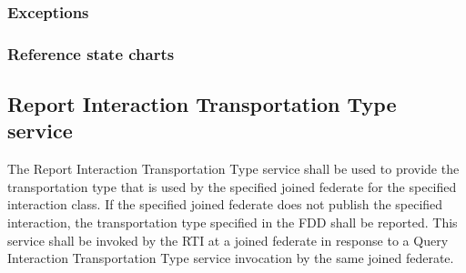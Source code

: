 \begin{compactstdpage}

    \subsubsection{Exceptions}



    \subsubsection{Reference state charts}



    \subsection{Report Interaction Transportation Type \rtiinitiated{} service}


    The Report Interaction Transportation Type \rtiinitiated{} service shall be used to provide the transportation type that is used by the specified joined federate for the specified interaction class. If the specified joined federate does not publish the specified interaction, the transportation type specified in the FDD shall be reported. This service shall be invoked by the RTI at a joined federate in response to a Query Interaction Transportation Type service invocation by the same joined federate.

\end{compactstdpage}

\clearpage

